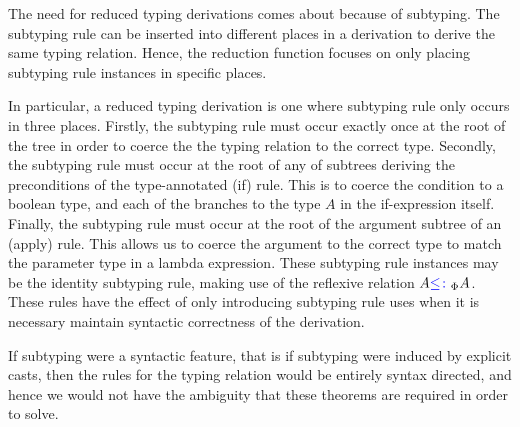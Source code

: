 \documentclass{Report}
\begin{document}
The need for reduced typing derivations comes about because of subtyping. The subtyping rule can be inserted into different places in a derivation to derive the same typing relation. Hence, the reduction function focuses on only placing subtyping rule instances in specific places. 

In particular, a reduced typing derivation is one where subtyping rule only occurs in three places. Firstly, the subtyping rule must occur exactly once at the root of the tree in order to coerce the the typing relation to the correct type. Secondly, the subtyping rule must occur at the root of any of subtrees deriving the preconditions of the type-annotated (if) rule. This is to coerce the condition to a boolean type, and each of the branches to the type $A$ in the if-expression itself. Finally, the subtyping rule must occur at the root of the argument subtree of an (apply) rule. This allows us to coerce the argument to the correct type to match the parameter type in a lambda expression. These subtyping rule instances may be the identity subtyping rule, making use of the reflexive relation $A {\color{blue} \leq\colon}_\Phi A$. These rules have the effect of only introducing subtyping rule uses when it is necessary maintain syntactic correctness of the derivation. 

\begin{aside}
    If subtyping were a syntactic feature, that is if subtyping were induced by explicit casts, then the rules for the typing relation would be entirely syntax directed, and hence we would not have the ambiguity that these theorems are required in order to solve.
\end{aside}
\end{document}
